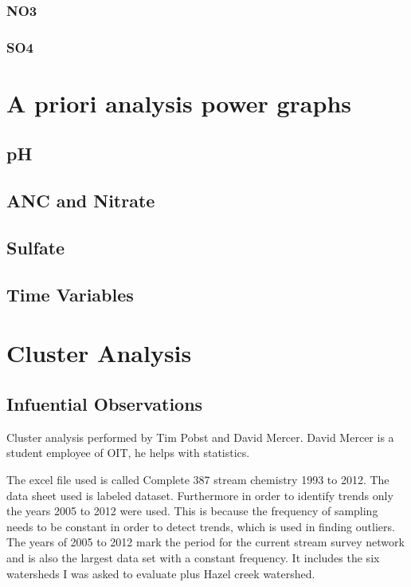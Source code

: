 		\subsection{NO3}
			\pagebreak

		\subsection{SO4}
			\pagebreak

\chapter{A priori analysis power graphs}\label{ch:APA}\pagebreak

	\section{pH}
		\pagebreak%

	\section{ANC and Nitrate}
		\pagebreak

	\section{Sulfate}
		\pagebreak

	\section{Time Variables}
		\pagebreak

\chapter{Cluster Analysis}\label{ch:CA}
	\section{Infuential Observations}

Cluster analysis performed by Tim Pobst and David Mercer.  David Mercer is a student employee of OIT, he helps with statistics.
    
The excel file used is called Complete 387 stream chemistry 1993 to 2012.  The data sheet used is labeled dataset.  Furthermore in order to identify trends only the years 2005 to 2012 were used.  This is because the frequency of sampling needs to be constant in order to detect trends, which is used in finding outliers.  The years of 2005 to 2012 mark the period for the current stream survey network and is also the largest data set with a constant frequency.  It includes the six watersheds I was asked to evaluate plus Hazel creek watershed.

